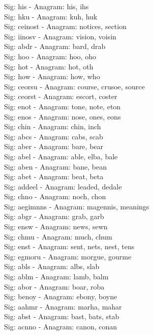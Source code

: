 Sig: {his} - Anagram: his, ihs \\
Sig: {hku} - Anagram: kuh, huk \\
Sig: {ceinost} - Anagram: notices, section \\
Sig: {iinosv} - Anagram: vision, voisin \\
Sig: {abdr} - Anagram: bard, drab \\
Sig: {hoo} - Anagram: hoo, oho \\
Sig: {hot} - Anagram: hot, oth \\
Sig: {how} - Anagram: how, who \\
Sig: {ceorsu} - Anagram: course, crusoe, source \\
Sig: {ceorst} - Anagram: escort, coster \\
Sig: {enot} - Anagram: tone, note, eton \\
Sig: {enos} - Anagram: nose, ones, eons \\
Sig: {chin} - Anagram: chin, inch \\
Sig: {abcs} - Anagram: cabs, scab \\
Sig: {aber} - Anagram: bare, bear \\
Sig: {abel} - Anagram: able, elba, bale \\
Sig: {aben} - Anagram: bane, bean \\
Sig: {abet} - Anagram: beat, beta \\
Sig: {addeel} - Anagram: leaded, dedale \\
Sig: {chno} - Anagram: noch, chon \\
Sig: {aegimnns} - Anagram: magennis, meanings \\
Sig: {abgr} - Anagram: grab, garb \\
Sig: {ensw} - Anagram: news, sewn \\
Sig: {chmu} - Anagram: much, chum \\
Sig: {enst} - Anagram: sent, nets, nest, tens \\
Sig: {egmoru} - Anagram: morgue, gourme \\
Sig: {abls} - Anagram: albs, slab \\
Sig: {ablm} - Anagram: lamb, balm \\
Sig: {abor} - Anagram: boar, roba \\
Sig: {benoy} - Anagram: ebony, boyne \\
Sig: {aahmr} - Anagram: marha, mahar \\
Sig: {abst} - Anagram: bast, bats, stab \\
Sig: {acnno} - Anagram: canon, conan \\
